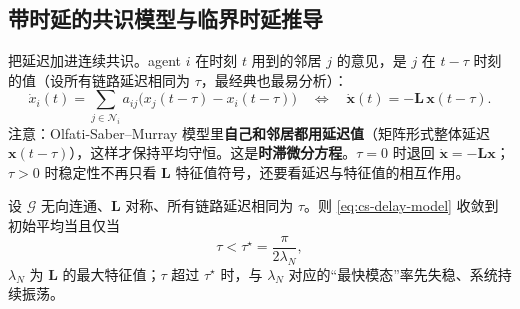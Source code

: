 \subsection{带时延的共识模型与临界时延推导}
\label{sec:cs-delay-deriv}

把延迟加进连续共识。agent $i$ 在时刻 $t$ 用到的邻居 $j$ 的意见，是 $j$ 在 $t-\tau$ 时刻的值（设所有链路延迟相同为 $\tau$，最经典也最易分析）：
\begin{equation}
  \dot x_i(t)=\sum_{j\in\mathcal{N}_i}a_{ij}\big(x_j(t-\tau)-x_i(t-\tau)\big)\quad\Longleftrightarrow\quad \dot{\mathbf{x}}(t)=-\mathbf{L}\,\mathbf{x}(t-\tau).
  \label{eq:cs-delay-model}
\end{equation}
注意：Olfati-Saber--Murray 模型里\textbf{自己和邻居都用延迟值}（矩阵形式整体延迟 $\mathbf{x}(t-\tau)$），这样才保持平均守恒。这是\textbf{时滞微分方程}。$\tau=0$ 时退回 $\dot{\mathbf{x}}=-\mathbf{L}\mathbf{x}$；$\tau>0$ 时稳定性不再只看 $\mathbf{L}$ 特征值符号，还要看延迟与特征值的相互作用。

\begin{theorem}[无向固定拓扑下的临界时延]\label{thm:cs-critical-delay}
设 $\mathcal{G}$ 无向连通、$\mathbf{L}$ 对称、所有链路延迟相同为 $\tau$。则 \cref{eq:cs-delay-model} 收敛到初始平均当且仅当
\begin{equation}
  \tau<\tau^\star=\frac{\pi}{2\lambda_N},
  \label{eq:cs-tau-star}
\end{equation}
$\lambda_N$ 为 $\mathbf{L}$ 的最大特征值；$\tau$ 超过 $\tau^\star$ 时，与 $\lambda_N$ 对应的“最快模态”率先失稳、系统持续振荡。
\end{theorem}

